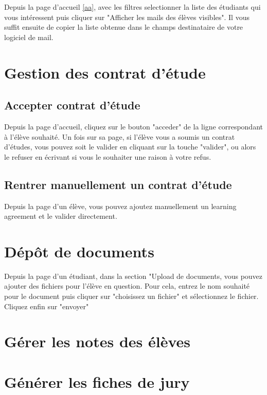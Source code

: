Depuis la page d'accueil \ref{aa}, avec les filtres selectionner la liste des étudiants qui vous intéressent puis cliquer sur "Afficher les mails des élèves visibles". Il vous suffit ensuite de copier la liste obtenue dans le champs destinataire de votre logiciel de mail.

\section{Gestion des contrat d'étude}

\subsection{Accepter contrat d'étude}
Depuis la page d'accueil, cliquez sur le bouton "acceder" de la ligne correspondant à l'élève souhaité. Un fois sur sa page, si l'élève vous a soumis un contrat d'études, vous pouvez soit le valider en cliquant sur la touche "valider", ou alors le refuser en écrivant si vous le souhaiter une raison à votre refus.

\subsection{Rentrer manuellement un contrat d'étude}
Depuis la page d'un élève, vous pouvez ajoutez manuellement un learning agreement et le valider directement.

\section{Dépôt de documents}

Depuis la page d'un étudiant, dans la section "Upload de documents, vous pouvez ajouter des fichiers pour l'élève en question. Pour cela, entrez le nom souhaité pour le document puis cliquer sur "choisissez un fichier" et sélectionnez le fichier. Cliquez enfin sur "envoyer" 

\section{Gérer les notes des élèves}

\section{Générer les fiches de jury}
\label{fju}

